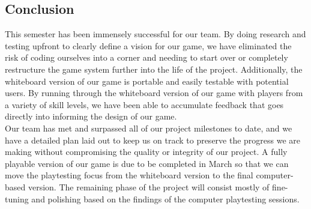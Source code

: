 \subsection{Conclusion}
This semester has been immensely successful for our team. By doing research and testing upfront to clearly define a vision for our game, we have eliminated the risk of coding ourselves into a corner and needing to start over or completely restructure the game system further into the life of the project. Additionally, the whiteboard version of our game is portable and easily testable with potential users. By running through the whiteboard version of our game with players from a variety of skill levels, we have been able to accumulate feedback that goes directly into informing the design of our game.\\

Our team has met and surpassed all of our project milestones to date, and we have a detailed plan laid out to keep us on track to preserve the progress we are making without compromising the quality or integrity of our project. A fully playable version of our game is due to be completed in March so that we can move the playtesting focus from the whiteboard version to the final computer-based version. The remaining phase of the project will consist mostly of fine-tuning and polishing based on the findings of the computer playtesting sessions.\\